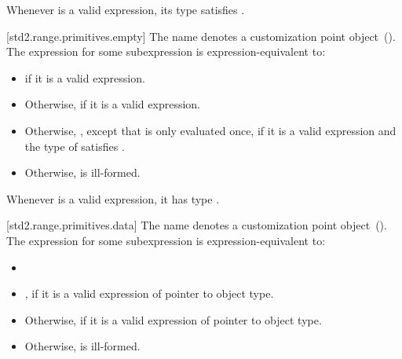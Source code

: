 \pnum
\enternote Whenever  is a valid expression, its
type satisfies . \exitnote

[std2.range.primitives.empty]{}
\pnum
The name  denotes a customization point
object~(). The expression
 for some subexpression  is
expression-equivalent to:

\begin{itemize}
\item
   if it is a valid expression.

\item
  Otherwise,  if it is a valid expression.

\item
  Otherwise, ,
  except that  is only evaluated once, if it is a valid expression and the type of
   satisfies .

\item
  Otherwise,  is ill-formed.
\end{itemize}

\pnum
\enternote Whenever  is a valid expression, it
has type . \exitnote

[std2.range.primitives.data]{}
\pnum
The name  denotes a customization point
object~(). The expression
 for some subexpression  is
expression-equivalent to:

\begin{itemize}
\item

\item
  ,
   if it is a valid expression of pointer
  to object type.

\item
  Otherwise,  if it is a valid expression of pointer to
  object type.

\item
  Otherwise,  is ill-formed.
\end{itemize}

